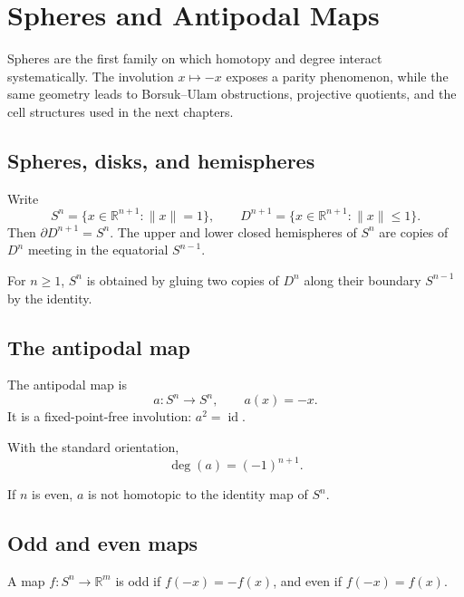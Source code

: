 ﻿\chapter{Spheres and Antipodal Maps}
\label{ch:viii04-spheres-antipodal}

Spheres are the first family on which homotopy and degree interact systematically.
The involution \(x\mapsto -x\) exposes a parity phenomenon, while the same
geometry leads to Borsuk--Ulam obstructions, projective quotients, and the cell
structures used in the next chapters.

\section{Spheres, disks, and hemispheres}
Write
\[
S^n=\{x\in\mathbb R^{n+1}:\|x\|=1\},\qquad
D^{n+1}=\{x\in\mathbb R^{n+1}:\|x\|\le1\}.
\]
Then \(\partial D^{n+1}=S^n\).  The upper and lower closed hemispheres of
\(S^n\) are copies of \(D^n\) meeting in the equatorial \(S^{n-1}\).

\begin{proposition}\label{prop:viii04-two-disks}
For \(n\ge1\), \(S^n\) is obtained by gluing two copies of \(D^n\) along their
boundary \(S^{n-1}\) by the identity.
\end{proposition}

\section{The antipodal map}
\begin{definition}\label{def:viii04-antipodal}
The antipodal map is
\[
a:S^n\to S^n,\qquad a(x)=-x.
\]
It is a fixed-point-free involution: \(a^2=\operatorname{id}\).
\end{definition}

\begin{theorem}\label{thm:viii04-antipodal-degree}
With the standard orientation,
\[
\deg(a)=(-1)^{n+1}.
\]
\end{theorem}

\begin{corollary}\label{cor:viii04-parity}
If \(n\) is even, \(a\) is not homotopic to the identity map of \(S^n\).
\end{corollary}

\section{Odd and even maps}
\begin{definition}\label{def:viii04-odd-even}
A map \(f:S^n\to\mathbb R^m\) is odd if \(f(-x)=-f(x)\), and even if
\(f(-x)=f(x)\).
\end{definition}

